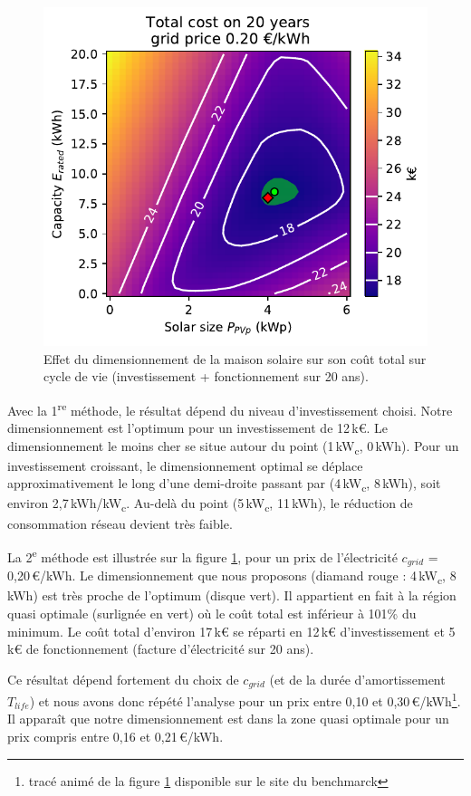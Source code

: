\documentclass[a4paper,10pt,twocolumn]{article}
\newcommand\tsp[1]{\textsuperscript{#1}}
\newcommand\sub[1]{\textsubscript{#1}}
\newcommand\kWc{kW\sub{c}{}} %
\begin{document}
\begin{figure}[!ht]
  \begin{center}
	  \includegraphics[width=0.8\columnwidth]{figures/Total_cost_map_grid020.pdf}
  \end{center}

  \caption{Effet du dimensionnement de la maison solaire sur son coût total sur cycle de vie
  (investissement + fonctionnement sur 20 ans).
  }
  \label{fig:cost_tot}
\end{figure}

Avec la 1\tsp{re} méthode, le résultat dépend du niveau d'investissement choisi.
Notre dimensionnement est l'optimum pour un investissement de 12\,k€.
Le dimensionnement le moins cher se situe autour du point
(1\,\kWc, 0\,kWh). Pour un investissement croissant,
le dimensionnement optimal se déplace approximativement le long
d'une demi-droite passant par (4\,\kWc, 8\,kWh), soit environ
2,7\,kWh/\kWc.
Au-delà du point (5\,\kWc, 11\,kWh), le réduction de consommation réseau devient très faible.

La 2\tsp{e} méthode est illustrée sur la figure \ref{fig:cost_tot},
pour un prix de l'électricité $c_{grid}$ = 0,20\,€/kWh.
Le dimensionnement que nous proposons (diamand rouge : 4\,kW\sub{c}, 8\,kWh)
est très proche de l'optimum (disque vert).
Il appartient en fait à la région quasi optimale (surlignée en vert)
où le coût total est inférieur à 101\% du minimum.
Le coût total d'environ 17\,k€ se réparti en 12\,k€ d'investissement
et 5\,k€ de fonctionnement (facture d'électricité sur 20 ans).

Ce résultat dépend fortement du choix de $c_{grid}$
(et de la durée d'amortissement $T_{life}$)
et nous avons donc répété l'analyse pour un prix entre 0,10 et 0,30\,€/kWh\footnote{%
  tracé animé de la figure \ref{fig:cost_tot} disponible sur le site du benchmarck}.
Il apparaît que notre dimensionnement est dans la zone quasi optimale pour un prix
compris entre 0,16 et 0,21\,€/kWh.
\end{document}
